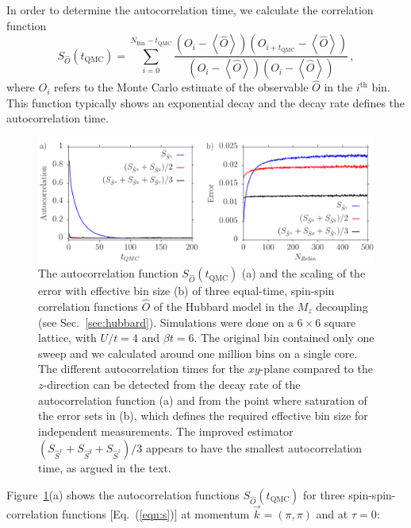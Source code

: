 In order to determine the autocorrelation time, we calculate the correlation function
\begin{equation}
\label{eqn:autocorrel}
	S_{\hat{O}}(t_{\textrm{QMC}})=\sum_{i=0}^{N_{\textrm{Bin}}-t_{\textrm{QMC}}}\frac{\left(O_i-\left\langle \hat{O}\right\rangle \right)\left(O_{i+t_{\textrm{QMC}}}-\left\langle \hat{O}\right\rangle \right)}{\left(O_i-\left\langle \hat{O}\right\rangle \right)\left(O_{i}-\left\langle \hat{O}\right\rangle \right)}\, ,
\end{equation}
where $O_i$ refers to the Monte Carlo estimate of the observable $\hat{O}$ in the $i^{\text{th}}$ bin. This function typically shows an exponential decay and the decay rate defines the autocorrelation time.
%
\begin{figure}
	\begin{center}
		\includegraphics[width=.95\textwidth]{Figures/fig1.pdf}
		\caption{The autocorrelation function $S_{\hat{O}}(t_{\textrm{QMC}})$ (a) and the scaling of the error with effective bin size (b) of three equal-time, spin-spin correlation functions $\hat{O}$ of the Hubbard model in the $M_z$ decoupling (see Sec.~\ref{sec:hubbard}). Simulations were done on a $ 6 \times 6$ square lattice, with  $U/t=4$ and $\beta t = 6$.  The original bin contained only one sweep and we calculated around one million bins on a single core. The different  autocorrelation times for the $xy$-plane compared to the $z$-direction can be detected from the decay rate of the autocorrelation function (a) and from the point where saturation of the error sets in (b), which defines the required effective bin size for independent measurements. The improved estimator $(S_{\hat{S}^{x}} + S_{\hat{S}^{y}}+ S_{\hat{S}^{z}})/3$ appears to have the smallest autocorrelation time, as argued in the text.}
		\label{fig_autocorr}
	\end{center}
\end{figure}
%
Figure~\ref{fig_autocorr}(a) shows the autocorrelation functions $S_{\hat{O}}(t_{\textrm{QMC}})$ for three spin-spin-correlation functions [Eq.~(\ref{eqn:s})] at momentum $\vec{k}=(\pi,\pi)$ and at $\tau=0$: 

